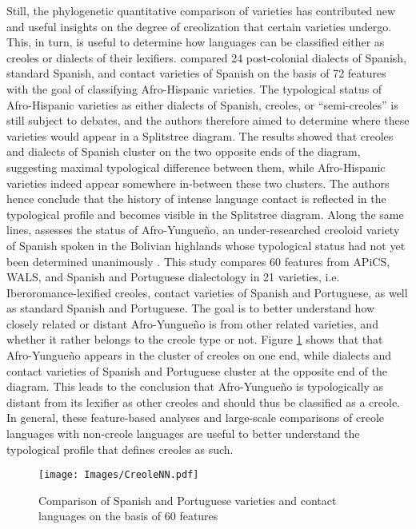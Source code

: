 \documentclass[output=paper]{langscibook}
\begin{document}
Still, the phylogenetic quantitative comparison of varieties has contributed new and useful insights on the degree of creolization that certain varieties undergo. This, in turn, is useful to determine how languages can be classified either as creoles or dialects of their lexifiers. \citet{perezetal2017afro} compared 24 post-colonial dialects of Spanish, standard Spanish, and contact varieties of Spanish on the basis of 72 features with the goal of classifying Afro-Hispanic varieties. The typological status of Afro-Hispanic varieties as either dialects of Spanish, creoles, or “semi-creoles” \citep[cf.][]{holm2004languages} is still subject to debates, and the authors therefore aimed to determine where these varieties would appear in a Splitstree diagram. The results showed that creoles and dialects of Spanish cluster on the two opposite ends of the diagram, suggesting maximal typological difference between them, while Afro-Hispanic varieties indeed appear somewhere in-between these two clusters. The authors hence conclude that the history of intense language contact is reflected in the typological profile and becomes visible in the Splitstree diagram. Along the same lines, \citet{perez2017from} assesses the status of Afro-Yungueño, an under-researched creoloid variety of Spanish spoken in the Bolivian highlands whose typological status had not yet been determined unanimously \citep[cf.][]{perezetal2017afro}. This study compares 60 features from APiCS, WALS, and Spanish and Portuguese dialectology in 21 varieties, i.e. Iberoromance-lexified creoles, contact varieties of Spanish and Portuguese, as well as standard Spanish and Portuguese. The goal is to better understand how closely related or distant Afro-Yungueño is from other related varieties, and whether it rather belongs to the creole type or not. Figure \ref{CreoleNN} shows that that Afro-Yungueño appears in the cluster of creoles on one end, while dialects and contact varieties of Spanish and Portuguese cluster at the opposite end of the diagram. This leads to the conclusion that Afro-Yungueño is typologically as distant from its lexifier as other creoles and should thus be classified as a creole. In general, these feature-based analyses and large-scale comparisons of creole languages with non-creole languages are useful to better understand the typological profile that defines creoles as such.

\begin{figure}[h]
\texttt{[image: Images/CreoleNN.pdf]}
\caption{Comparison of Spanish and Portuguese varieties and contact languages on the basis of 60 features\label{CreoleNN}}
\end{figure}
\end{document}
